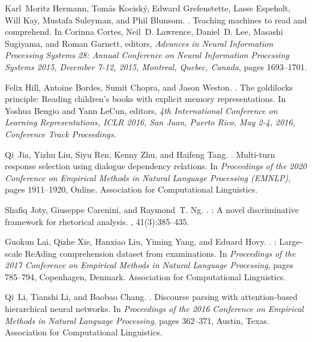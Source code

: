 \documentclass[11pt]{article}
\begin{document}
\begin{thebibliography}{}
Karl~Moritz Hermann, Tom{\'{a}}s Kocisk{\'{y}}, Edward Grefenstette, Lasse
  Espeholt, Will Kay, Mustafa Suleyman, and Phil Blunsom.
.
\newblock Teaching machines to read and comprehend.
\newblock In Corinna Cortes, Neil~D. Lawrence, Daniel~D. Lee, Masashi Sugiyama,
  and Roman Garnett, editors, {\em Advances in Neural Information Processing
  Systems 28: Annual Conference on Neural Information Processing Systems 2015,
  December 7-12, 2015, Montreal, Quebec, Canada}, pages 1693--1701.

Felix Hill, Antoine Bordes, Sumit Chopra, and Jason Weston.
.
\newblock The goldilocks principle: Reading children's books with explicit
  memory representations.
\newblock In Yoshua Bengio and Yann LeCun, editors, {\em 4th International
  Conference on Learning Representations, {ICLR} 2016, San Juan, Puerto Rico,
  May 2-4, 2016, Conference Track Proceedings}.

Qi~Jia, Yizhu Liu, Siyu Ren, Kenny Zhu, and Haifeng Tang.
.
\newblock Multi-turn response selection using dialogue dependency relations.
\newblock In {\em Proceedings of the 2020 Conference on Empirical Methods in
  Natural Language Processing (EMNLP)}, pages 1911--1920, Online. Association
  for Computational Linguistics.

Shafiq Joty, Giuseppe Carenini, and Raymond~T. Ng.
.
: A novel discriminative framework for rhetorical analysis.
, 41(3):385--435.

Guokun Lai, Qizhe Xie, Hanxiao Liu, Yiming Yang, and Eduard Hovy.
.
: Large-scale {R}e{A}ding comprehension dataset from
  examinations.
\newblock In {\em Proceedings of the 2017 Conference on Empirical Methods in
  Natural Language Processing}, pages 785--794, Copenhagen, Denmark.
  Association for Computational Linguistics.

Qi~Li, Tianshi Li, and Baobao Chang.
.
\newblock Discourse parsing with attention-based hierarchical neural networks.
\newblock In {\em Proceedings of the 2016 Conference on Empirical Methods in
  Natural Language Processing}, pages 362--371, Austin, Texas. Association for
  Computational Linguistics.


\end{thebibliography}
\end{document}
